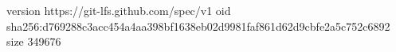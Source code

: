 version https://git-lfs.github.com/spec/v1
oid sha256:d769288c3acc454a4aa398bf1638eb02d9981faf861d62d9cbfe2a5c752c6892
size 349676
